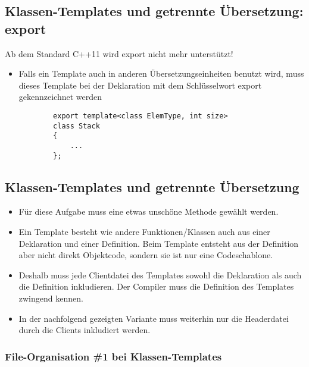 \subsection{Klassen-Templates und getrennte Übersetzung: export}
\label{sec:Klassen-Templates und getrennte Uebersetzung: export}
\begin{achtung}
	Ab dem Standard C++11 wird export nicht mehr unterstützt!
\end{achtung}
\begin{itemize}
	\item Falls ein Template auch in anderen Übersetzungseinheiten benutzt wird, muss dieses Template bei der Deklaration mit dem Schlüsselwort export gekennzeichnet werden
	\noindent
	\begin{minipage}{\linewidth}
		\begin{lstlisting}
		export template<class ElemType, int size>
		class Stack
		{
			...
		};
		\end{lstlisting}
	\end{minipage}
\end{itemize}

\subsection{Klassen-Templates und getrennte Übersetzung}
\label{sec:Klassen-Templates und getrennte Uebersetzung}
\begin{itemize}
	\item Für diese Aufgabe muss eine etwas unschöne Methode gewählt werden.
	\item Ein Template besteht wie andere Funktionen/Klassen auch aus einer Deklaration und einer Definition. Beim Template entsteht aus der Definition aber nicht direkt Objektcode, sondern sie ist nur eine Codeschablone.
	\item Deshalb muss jede Clientdatei des Templates sowohl die Deklaration als auch die Definition inkludieren. Der Compiler muss die Definition des Templates zwingend kennen.
	\item In der nachfolgend gezeigten Variante muss weiterhin nur die Headerdatei durch die Clients inkludiert werden.
\end{itemize}

\subsubsection{File-Organisation \#1 bei Klassen-Templates}
\label{sec:File-Organisation \#1 bei Klassen-Templates}




